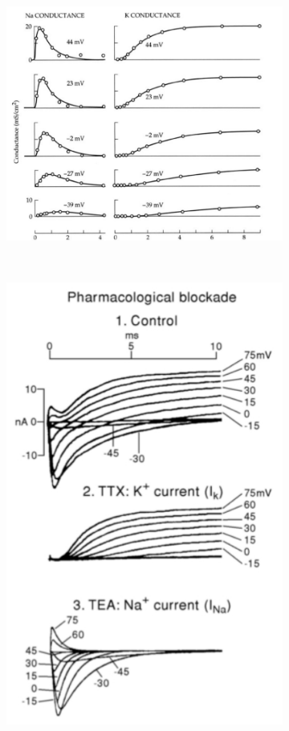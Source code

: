 \documentclass[a4paper, 12pt]{article}
\begin{document}
\begin{figure}[H]
	\centering
	\begin{subfigure}[b]{0.65\textwidth}
    	\centering
		\includegraphics[width=\textwidth]{5_4.jpg}
	\end{subfigure}%
	~
	\begin{subfigure}[b]{0.35\textwidth}
		\centering
		\includegraphics[width=\textwidth]{5_4_2.jpg}

\end{subfigure}
\end{figure}
\end{document}
